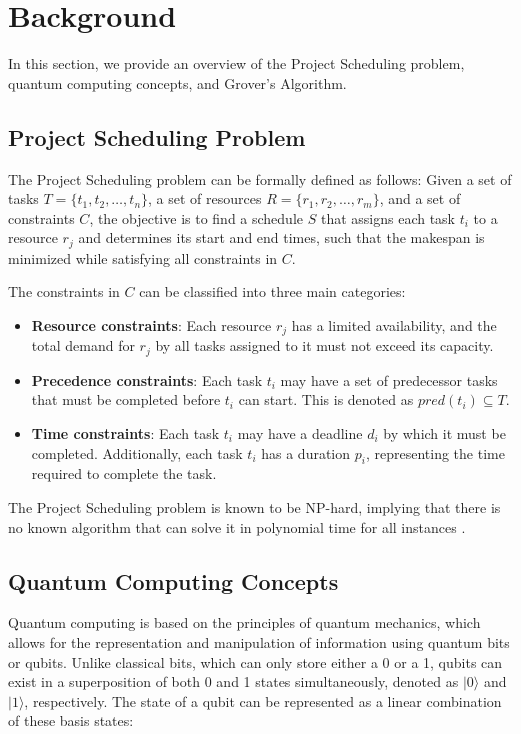 \section{Background} \label{sec:background}

In this section, we provide an overview of the Project Scheduling problem, quantum computing concepts, and Grover's Algorithm.

\subsection{Project Scheduling Problem}

The Project Scheduling problem can be formally defined as follows: Given a set of tasks $T = \{t_1, t_2, \dots, t_n\}$, a set of resources $R = \{r_1, r_2, \dots, r_m\}$, and a set of constraints $C$, the objective is to find a schedule $S$ that assigns each task $t_i$ to a resource $r_j$ and determines its start and end times, such that the makespan is minimized while satisfying all constraints in $C$.

The constraints in $C$ can be classified into three main categories:

\begin{itemize}
    \item \textbf{Resource constraints}: Each resource $r_j$ has a limited availability, and the total demand for $r_j$ by all tasks assigned to it must not exceed its capacity.
    \item \textbf{Precedence constraints}: Each task $t_i$ may have a set of predecessor tasks that must be completed before $t_i$ can start. This is denoted as $pred(t_i) \subseteq T$.
    \item \textbf{Time constraints}: Each task $t_i$ may have a deadline $d_i$ by which it must be completed. Additionally, each task $t_i$ has a duration $p_i$, representing the time required to complete the task.
\end{itemize}

The Project Scheduling problem is known to be NP-hard, implying that there is no known algorithm that can solve it in polynomial time for all instances \cite{blazewicz1983scheduling}.

\subsection{Quantum Computing Concepts}

Quantum computing is based on the principles of quantum mechanics, which allows for the representation and manipulation of information using quantum bits or qubits. Unlike classical bits, which can only store either a 0 or a 1, qubits can exist in a superposition of both 0 and 1 states simultaneously, denoted as $|0\rangle$ and $|1\rangle$, respectively. The state of a qubit can be represented as a linear combination of these basis states:

